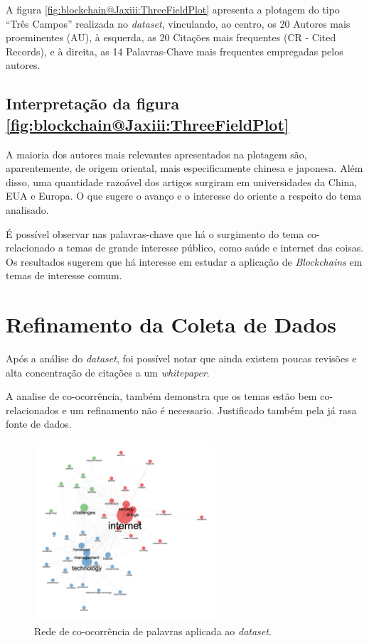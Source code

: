 A figura \ref{fig:blockchain@Jaxiii:ThreeFieldPlot} apresenta a plotagem do tipo ``Três Campos'' realizada no \textit{dataset}, vinculando, ao centro, os 20 Autores mais proeminentes (AU), à esquerda, as 20 Citações mais frequentes (CR - Cited Records), e à direita, as 14 Palavras-Chave mais frequentes empregadas pelos autores.

\subsection{Interpretação da figura \ref{fig:blockchain@Jaxiii:ThreeFieldPlot}}
A maioria dos autores mais relevantes apresentados na plotagem são, aparentemente, de origem oriental, mais especificamente chinesa e japonesa. Além disso, uma quantidade razoável dos artigos surgiram em universidades da China, EUA e Europa. O que sugere o avanço e o interesse do oriente a respeito do tema analisado.

É possível observar nas palavras-chave que há o surgimento do tema co-relacionado a temas de grande interesse público, como saúde e internet das coisas.
Os resultados sugerem que há interesse em estudar a aplicação de \textit{Blockchains} em temas de interesse comum.

\section{Refinamento da Coleta de Dados}

Após a análise do \textit{dataset}, foi possível notar que ainda existem poucas revisões e alta concentração de citações a um \textit{whitepaper}.

A analise de co-ocorrência, também demonstra que os temas estão bem co-relacionados e um refinamento não é necessario. Justificado também pela já
rasa fonte de dados.

\begin{figure}[htp]
    \centering
    \includegraphics[width=0.6\textwidth]{experiments/Jaxiii/PesquisaBibliometrica/Blockchains/co-ocurrence.png}
    \caption{Rede de co-ocorrência de palavras aplicada ao \textit{dataset}.}
    \label{fig:blockchains@Jaxiii:redecoocorrencia}
\end{figure}

